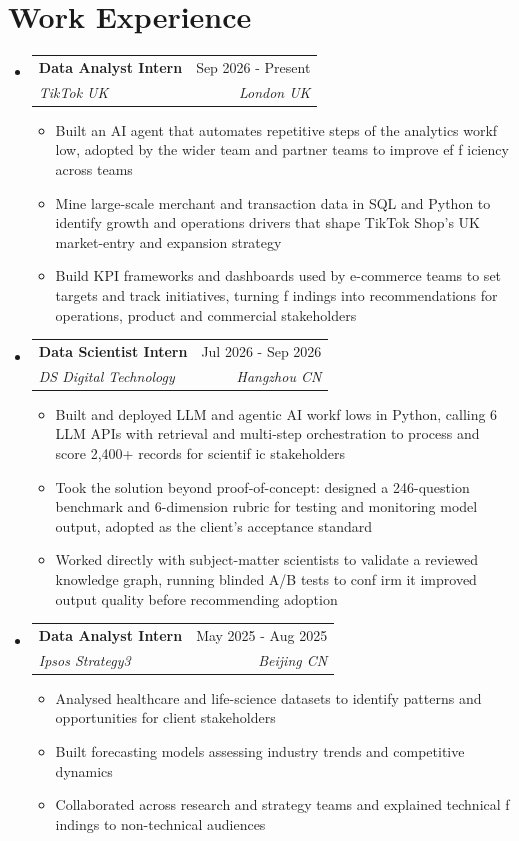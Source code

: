 \documentclass[letterpaper,11pt]{article}
\makeatletter
\newcommand{\resumeItem}[1]{
  \item\small{
    {#1 \vspace{-2pt}}
  }
}
\newcommand{\resumeSubheading}[4]{
  \vspace{-2pt}\item
    \begin{tabular*}{0.97\textwidth}[t]{l@{\extracolsep{\fill}}r}
      \textbf{#1} & #2 \\
      \textit{\small#3} & \textit{\small #4} \\
    \end{tabular*}\vspace{-7pt}
}
\newcommand{\resumeSubHeadingListStart}{\begin{itemize}[leftmargin=0.15in, label={}]}
\newcommand{\resumeSubHeadingListEnd}{\end{itemize}}
\newcommand{\resumeItemListStart}{\begin{itemize}}
\newcommand{\resumeItemListEnd}{\end{itemize}\vspace{-5pt}}
\makeatother
\begin{document}
\section{\textbf{Work Experience}}
  \resumeSubHeadingListStart

     \resumeSubheading
      {Data Analyst Intern}{Sep 2026 - Present}
      {TikTok UK}{London \textbf{\textbar{}} UK}
      \resumeItemListStart
        \resumeItem{Built an AI agent that automates repetitive steps of the analytics workf\kern0pt low, adopted by the wider team and partner teams to improve ef\kern0pt f\kern0pt iciency across teams}
        \resumeItem{Mine large-scale merchant and transaction data in SQL and Python to identify growth and operations drivers that shape TikTok Shop's UK market-entry and expansion strategy}
        \resumeItem{Build KPI frameworks and dashboards used by e-commerce teams to set targets and track initiatives, turning f\kern0pt indings into recommendations for operations, product and commercial stakeholders}
      \resumeItemListEnd


     \resumeSubheading
      {Data Scientist Intern}{Jul 2026 - Sep 2026}
      {DS Digital Technology}{Hangzhou \textbf{\textbar{}} CN}
      \resumeItemListStart
        \resumeItem{Built and deployed LLM and agentic AI workf\kern0pt lows in Python, calling 6 LLM APIs with retrieval and multi-step orchestration to process and score 2,400+ records for scientif\kern0pt ic stakeholders}
        \resumeItem{Took the solution beyond proof-of-concept: designed a 246-question benchmark and 6-dimension rubric for testing and monitoring model output, adopted as the client's acceptance standard}
        \resumeItem{Worked directly with subject-matter scientists to validate a reviewed knowledge graph, running blinded A/B tests to conf\kern0pt irm it improved output quality before recommending adoption}
      \resumeItemListEnd

      \resumeSubheading
      {Data Analyst Intern}{May 2025 - Aug 2025}
      {Ipsos Strategy3}{Beijing \textbf{\textbar{}} CN}
      \resumeItemListStart
        \resumeItem{Analysed healthcare and life-science datasets to identify patterns and opportunities for client stakeholders}
        \resumeItem{Built forecasting models assessing industry trends and competitive dynamics}
        \resumeItem{Collaborated across research and strategy teams and explained technical f\kern0pt indings to non-technical audiences}
      \resumeItemListEnd


 \resumeSubHeadingListEnd
\end{document}
